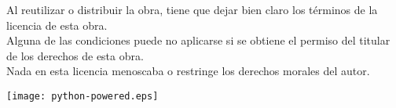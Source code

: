 \noindent
Al reutilizar o distribuir la obra, tiene que dejar bien claro los términos de la licencia de esta obra.\\

\noindent
Alguna de las condiciones puede no aplicarse si se obtiene el permiso del titular de los derechos de esta obra.\\

\noindent
Nada en esta licencia menoscaba o restringe los derechos morales del autor.\\

\vspace*{4cm}
\begin{center}
\texttt{[image: python-powered.eps]}
\end{center}

\mainmatter

\pagestyle{plain}

\tableofcontents

